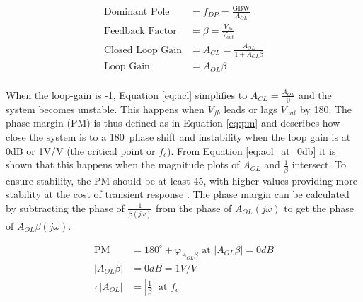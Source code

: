 \begin{align}
    \text{Dominant Pole} &= f_{DP} = \frac{\text{GBW}}{A_{OL}} \label{eq:fdp}\\
    \text{Feedback Factor} &= \beta = \frac{V_{fb}}{V_{out}}  \label{eq:fb_factor}\\
    \text{Closed Loop Gain} &= A_{CL} = \frac{A_{OL}}{1 + A_{OL}\beta} \label{eq:acl}\\
    \text{Loop Gain} &= A_{OL}\beta \label{eq:loop_gain}\\
\end{align}

When the loop-gain is -1, Equation \ref{eq:acl} simplifies to $A_{CL} = \frac{A_{OL}}{0}$ and the system becomes unstable. This happens when $V_{fb}$ leads or lags $V_{out}$ by 180\textdegree. The phase margin (PM) is thus defined as in Equation \ref{eq:pm} and describes how close the system is to a 180\textdegree\ phase shift and instability when the loop gain is at 0dB or 1V/V (the critical point or $f_c$). From Equation \ref{eq:aol_at_0db} it is shown that this happens when the magnitude plots of $A_{OL}$ and $\frac{1}{\beta}$ intersect. To ensure stability, the PM should be at least 45\textdegree, with higher values providing more stability at the cost of transient response \cite{StabilizeYourTransimpedance}. The phase margin can be calculated by subtracting the phase of $\frac{1}{\beta(j\omega)}$ from the phase of $A_{OL}(j\omega)$ to get the phase of $A_{OL}\beta(j\omega)$.

\begin{align}
    \text{PM} &= 180^\circ + \varphi_{A_{OL}\beta} \text{ at } |A_{OL}\beta| = 0dB \label{eq:pm} \\
    |A_{OL}\beta| &= 0dB = 1 V/V\\
    \therefore |A_{OL}| &= |\frac{1}{\beta}| \text{ at } f_c \label{eq:aol_at_0db}
\end{align}

